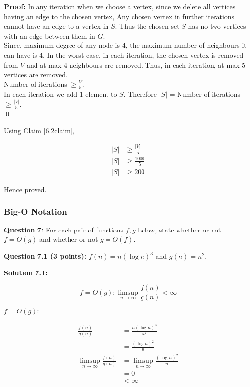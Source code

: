 \documentclass[11pt]{article}
\begin{document}
\textbf{Proof:} In any iteration when we choose a vertex,
since we delete all vertices having
an edge to the chosen vertex, Any chosen vertex in further iterations cannot
have an edge to a vertex in $S$. Thus the chosen set $S$ has no two vertices
with an edge between them in $G$.\\

Since, maximum degree of any node is 4, the maximum number
of neighbours it can have is 4. In the worst case, in each iteration, the
chosen vertex is removed from $V$ and at max 4 neighbours are removed. Thus,
in each iteration, at max 5 vertices are removed.\\

Number of iterations $\ge \frac{V}{5}$.\\

In each iteration we add 1 element to $S$.
Therefore $|S|$ = Number of iterations $\ge \frac{|V|}{5}$.\\

\qed

Using Claim \ref{6.2claim},

\begin{align*}
    |S| &\ge \frac{|V|}{5}\\
    |S| &\ge \frac{1000}{5}\\
    |S| &\ge 200
\end{align*}

Hence proved.

\subsubsection{Big-O Notation}\label{big-o-notation}

\textbf{Question 7:} For each pair of functions \(f,g\) below, state
whether or not \(f=O(g)\) and whether or not \(g=O(f)\).

\textbf{Question 7.1 (3 points):} \(f(n)=n(\log n)^3\) and \(g(n)=n^2\).

\textbf{Solution 7.1:} 

$$
f = O(g): \limsup_{n \rightarrow \infty} \frac{f(n)}{g(n)} < \infty
$$

$f = O(g):$

\begin{align*}
    \frac{f(n)}{g(n)} &= \frac{n(\log{n})^{3}}{n^{2}}\\
                      &= \frac{(\log{n})^{2}}{n}\\
    \limsup_{n \rightarrow \infty} \frac{f(n)}{g(n)} &=
    \limsup_{n \rightarrow \infty} \frac{(\log{n})^{2}}{n}\\
    &= 0\\
    &< \infty
\end{align*}
\end{document}
